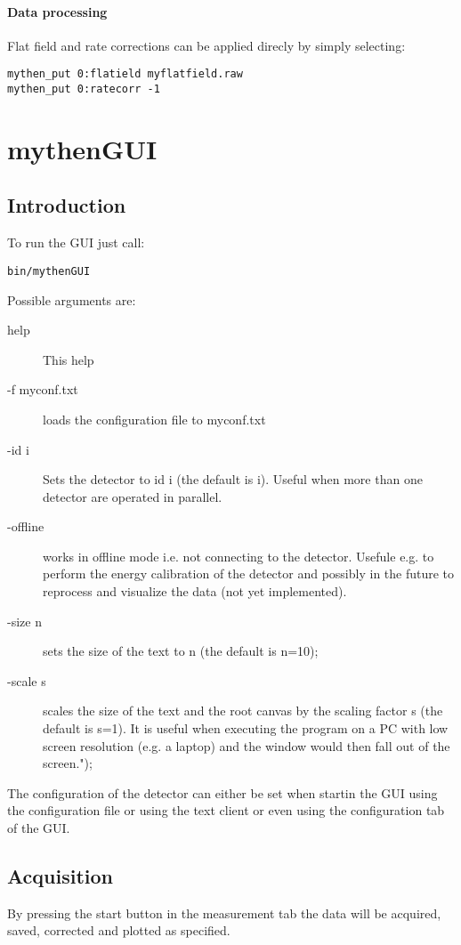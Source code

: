 \documentclass{report}
\begin{document}
\subsubsection{Data processing}
Flat field and rate corrections can be applied direcly by simply selecting:
\begin{verbatim}
mythen_put 0:flatield myflatfield.raw
mythen_put 0:ratecorr -1
\end{verbatim}


\chapter{mythenGUI}

\section{Introduction}

To run the GUI just call:
\begin{verbatim}
bin/mythenGUI 
\end{verbatim}
Possible arguments are:
\begin{description}
\item[help]  		This help  
\item[-f myconf.txt] loads the configuration file to myconf.txt
\item[-id i] Sets the detector to id i (the default is i). Useful when more than one detector are operated in parallel.
\item[-offline] works in offline mode i.e. not connecting to the detector. Usefule e.g. to perform the energy calibration of the detector and possibly in the future to reprocess and visualize the data (not yet implemented).
\item[-size n] sets the size of the text to n (the default is n=10);
\item[-scale s] scales the size of the text and the root canvas by the scaling factor s (the default is s=1). It is useful when executing the program on a PC with low screen resolution (e.g. a laptop) and the window would then fall out of the screen.");
\end{description}
The configuration of the detector can either be set when startin the GUI using the configuration file or using the text client or even using the configuration tab of the GUI.


\section{Acquisition}
By pressing the start button in the measurement tab the data will be acquired, saved, corrected and plotted as specified.
\end{document}
